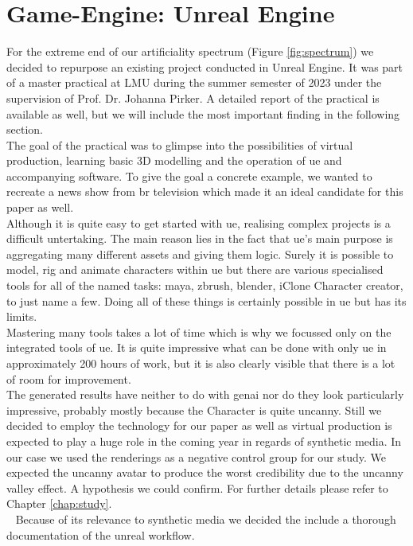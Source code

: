 \documentclass[
  a4paper,  %
  twoside,  %
  bibliography=totoc,
  headsepline,
  cleardoublepage=empty,
  parskip=half,
  draft=false
]{scrbook}
\begin{document}
\section{Game-Engine: Unreal Engine}
For the extreme end of our artificiality spectrum (Figure \ref{fig:spectrum}) we decided to repurpose an existing project conducted in Unreal Engine. It was part of a master practical at LMU during the summer semester of 2023 under the supervision of Prof. Dr. Johanna Pirker. A detailed report of the practical is available as well, but we will include the most important finding in the following section. \\
The goal of the practical was to glimpse into the possibilities of virtual production, learning basic 3D modelling and the operation of \gls{ue} and accompanying software. To give the goal a concrete example, we wanted to recreate a news show from \gls{br} television which made it an ideal candidate for this paper as well. \\
Although it is quite easy to get started with \gls{ue}, realising complex projects is a difficult untertaking. The main reason lies in the fact that \gls{ue}'s main purpose is aggregating many different assets and giving them logic. Surely it is possible to model, rig and animate characters within \gls{ue} but there are various specialised tools for all of the named tasks: maya, zbrush, blender, iClone Character creator, to just name a few. Doing all of these things is certainly possible in \gls{ue} but has its limits. \\
Mastering many tools takes a lot of time which is why we focussed only on the integrated tools of \gls{ue}. It is quite impressive what can be done with only \gls{ue} in approximately 200 hours of work, but it is also clearly visible that there is a lot of room for improvement. \\
The generated results have neither to do with \gls{genai} nor do they look particularly impressive, probably mostly because the Character is quite uncanny. Still we decided to employ the technology for our paper as well as virtual production is expected to play a huge role in the coming year in regards of synthetic media. In our case we used the renderings as a negative control group for our study. We expected the uncanny avatar to produce the worst credibility due to the uncanny valley effect. A hypothesis we could confirm. For further details please refer to Chapter \ref{chap:study}. \\ 
Because of its relevance to synthetic media we decided the include a thorough documentation of the unreal workflow.
\end{document}
